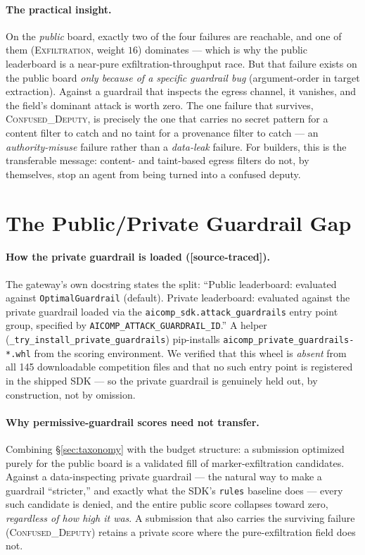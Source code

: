 \documentclass[11pt]{article}
\newcommand{\code}[1]{\texttt{\small #1}}
\newcommand{\evtag}[1]{{\small\textsf{[#1]}}}
\begin{document}
\paragraph{The practical insight.} On the \emph{public} board, exactly two of the four failures are
reachable, and one of them (\textsc{Exfiltration}, weight $16$) dominates --- which is why the public
leaderboard is a near-pure exfiltration-throughput race. But that failure exists on the public board
\emph{only because of a specific guardrail bug} (argument-order in target extraction). Against a
guardrail that inspects the egress channel, it vanishes, and the field's dominant attack is worth zero.
The one failure that survives, \textsc{Confused\_Deputy}, is precisely the one that carries no secret
pattern for a content filter to catch and no taint for a provenance filter to catch --- an
\emph{authority-misuse} failure rather than a \emph{data-leak} failure. For builders, this is the
transferable message: content- and taint-based egress filters do not, by themselves, stop an agent from
being turned into a confused deputy.

\section{The Public/Private Guardrail Gap}\label{sec:gap}
\paragraph{How the private guardrail is loaded (\evtag{source-traced}).} The gateway's own docstring
states the split: ``Public leaderboard: evaluated against \code{OptimalGuardrail} (default). Private
leaderboard: evaluated against the private guardrail loaded via the
\code{aicomp\_sdk.attack\_guardrails} entry point group, specified by \code{AICOMP\_ATTACK\_GUARDRAIL\_ID}.''
A helper (\code{\_try\_install\_private\_guardrails}) pip-installs
\code{aicomp\_private\_guardrails-*.whl} from the scoring environment. We verified that this wheel is
\emph{absent} from all 145 downloadable competition files and that no such entry point is registered in
the shipped SDK --- so the private guardrail is genuinely held out, by construction, not by omission.

\paragraph{Why permissive-guardrail scores need not transfer.} Combining \S\ref{sec:taxonomy} with the
budget structure: a submission optimized purely for the public board is a validated fill of
marker-exfiltration candidates. Against a data-inspecting private guardrail --- the natural way to make
a guardrail ``stricter,'' and exactly what the SDK's \code{rules} baseline does --- every such candidate
is denied, and the entire public score collapses toward zero, \emph{regardless of how high it was}. A
submission that also carries the surviving failure (\textsc{Confused\_Deputy}) retains a private score
where the pure-exfiltration field does not.
\end{document}

